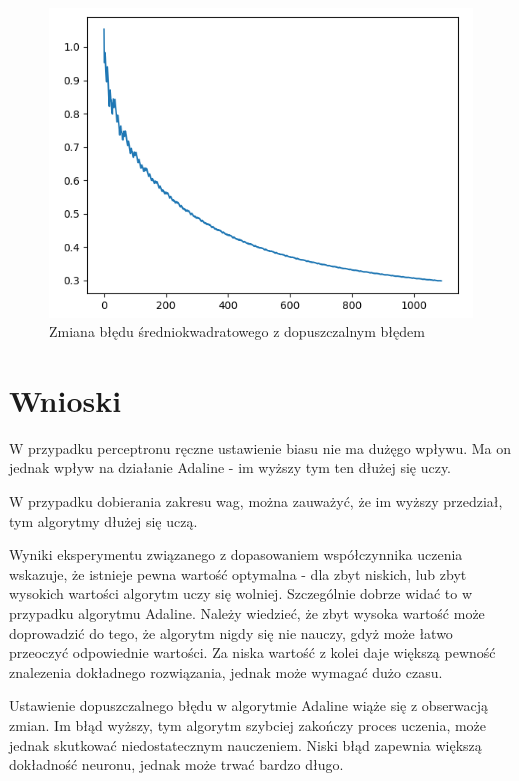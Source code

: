 \documentclass{article}
\begin{document}
\begin{figure}[h]
  \centering
  \includegraphics[width=.8\textwidth]{03lr.png}
  \caption{Zmiana błędu średniokwadratowego z dopuszczalnym błędem}
\end{figure}

\section{Wnioski}

W przypadku perceptronu ręczne ustawienie biasu nie ma dużęgo wpływu. Ma on jednak wpływ na działanie
Adaline - im wyższy tym ten dłużej się uczy.

W przypadku dobierania zakresu wag, można zauważyć, że im wyższy przedział, tym algorytmy dłużej się uczą.

Wyniki eksperymentu związanego z dopasowaniem współczynnika uczenia wskazuje, że istnieje pewna wartość
optymalna - dla zbyt niskich, lub zbyt wysokich wartości algorytm uczy się wolniej. Szczególnie dobrze
widać to w przypadku algorytmu Adaline. Należy wiedzieć, że zbyt wysoka wartość może doprowadzić do tego,
że algorytm nigdy się nie nauczy, gdyż może łatwo przeoczyć odpowiednie wartości. Za niska wartość z kolei
daje większą pewność znalezenia dokładnego rozwiązania, jednak może wymagać dużo czasu.

Ustawienie dopuszczalnego błędu w algorytmie Adaline wiąże się z obserwacją zmian. Im błąd wyższy, tym algorytm
szybciej zakończy proces uczenia, może jednak skutkować niedostatecznym nauczeniem. Niski błąd zapewnia większą
dokładność neuronu, jednak może trwać bardzo długo.
\end{document}
